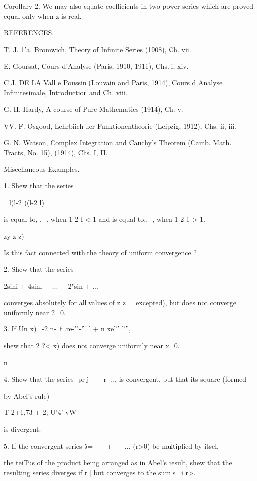 Corollary 2. We may also equate coefficients in two power series which
are proved equal only when z is real.

REFERENCES.

T. J. 1'a. Bromwich, Theory of Infinite Series (1908), Ch. vii.

E. Goursat, Cours d'Analyse (Paris, 1910, 1911), Chs. i, xiv.

C J. DE LA Vall e Poussin (Louvain and Paris, 1914), Cours d Analyse
Infinitesimale, Introduction and Ch. viii.

G. H. Hardy, A course of Pure Mathematics (1914), Ch. v.

VV. F. Osgood, Lehrbiich der Funktionentheorie (Leipzig, 1912), Chs.
ii, iii.

G. N. Watson, Complex Integration and Cauchy's Theorem (Camb. Math.
Tracts, No. 15), (1914), Chs. I, II.

Miscellaneous Examples.

1. Shew that the series

 =l(l-2 )(l-2 l)

is equal to,-, -. when 1 2 I < 1 and is equal to,, -, when 1 2 1 >
1.

  zy z z)-

Is this fact connected with the theory of uniform convergence ?

2. Shew that the series

2sini + 4sinl + ... + 2"sin + ...

converges absolutely for all values of z z = excepted), but does not
converge uniformly near 2=0.

3. If Un x)=-2 n-\ f .re-'"-''' ' + n xe''' '''',

shew that 2 ?< x) does not converge uniformly near x=0.

n = \

4. Shew that the series -pr j- + -r -... is convergent, but that its
square (formed

by Abel's rule)

T 2+1,73 + 2; U'4' vW -

is divergent.

5. If the convergent series 5=- - - +---+... (r>0) be multiplied by
itsel,

the teiTus of the product being arranged as in Abel's result, shew
that the resulting series diverges if r | but converges to the sum s \
i r>. 

%
%

